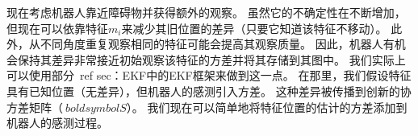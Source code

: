 
现在考虑机器人靠近障碍物并获得额外的观察。 虽然它的不确定性在不断增加，但现在可以依靠特征$ m_i $来减少其旧位置的差异（只要它知道该特征不移动）。 此外，从不同角度重复观察相同的特征可能会提高其观察质量。 因此，机器人有机会保持其差异非常接近初始观察该特征的方差并将其存储到其图中。 我们实际上可以使用部分\ ref {sec：EKF}中的EKF框架来做到这一点。 在那里，我们假设特征具有已知位置（无差异），但机器人的感测引入方差。 这种差异被传播到创新的协方差矩阵（$ \ boldsymbol {S} $）。 我们现在可以简单地将特征位置的估计的方差添加到机器人的感测过程。


